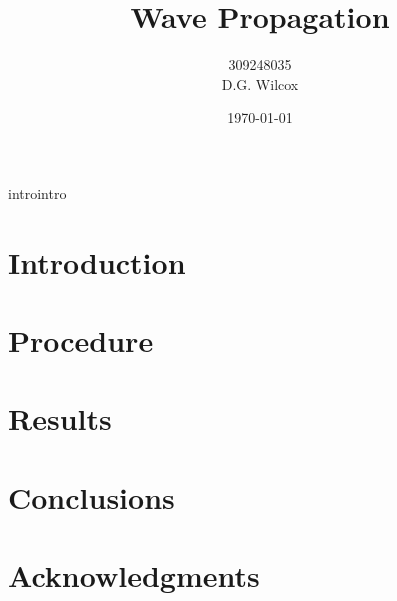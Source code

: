 \documentclass[aps,prl,twocolumn,groupedaddress,showkeys]{revtex4}
\begin{document}
\title{Wave Propagation}
\author{309248035 \\
				D.G. Wilcox}

\noaffiliation{}

\date{\today}

\begin{abstract}
\end{abstract}



\maketitle

introintro

\section{Introduction}


\section{Procedure}



\section{Results}

\section{Conclusions}

\section{Acknowledgments}
\end{document}
